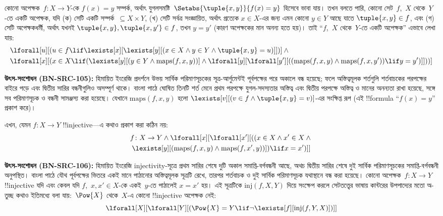 \documentclass[../../../include/open-logic-section]{subfiles}
\begin{document}
কোনো অপেক্ষক~$f \colon X \to Y$-কে $f(x)=y$ সম্পর্ক, অর্থাৎ
যুগলসমষ্টি~$\Setabs{\tuple{x,y}}{f(x)=y}$ হিসেবে ভাবা যায়। তখন বলতে
পারি, কোনো সেট~$f$,~$X$ থেকে~$Y$-তে একটি অপেক্ষক, যদি (ক) সেটি একটি
সম্পর্ক~$\subseteq X \times Y$, (খ) সেটি সর্বত্র সংজ্ঞায়িত, অর্থাৎ
প্রত্যেক $x \in X$-এর জন্য এমন কোনো $y \in Y$ আছে যাতে
$\tuple{x,y} \in f$, এবং (গ) সেটি অপেক্ষকধর্মী, অর্থাৎ যখনই
$\tuple{x,y},\tuple{x,y'} \in f$, তখন $y=y'$ (কারণ অপেক্ষকের মান
অনন্য হতে হয়)। তাই “$f$,~$X$ থেকে~$Y$-তে একটি অপেক্ষক” এভাবে লেখা
যায়:
\begin{align*}
 & \lforall[u][(u \in f \lif
      \lexists[x][\lexists[y][(x \in X \land y \in
      Y \land \tuple{x, y} = u)]])] \land {}\\
 & \lforall[x][(x \in X \lif
      (\lexists[y][(y \in Y \land \mathrm{maps}(f, x, y))] \land
      \lforall[y][\lforall[y'][((\mathrm{maps}(f, x, y) \land
      \mathrm{maps}(f, x, y')) \lif y = y')]]))]
\end{align*}
\par\smallskip\noindent\textnormal{\small\textbf{উৎস-সংশোধন (BN-SRC-105):} হিমায়িত ইংরেজি প্রদর্শনে উভয় সার্বিক পরিমাণসূচকের সূত্র-আর্গুমেন্টই পূর্বপক্ষের পরে অকালে বন্ধ হয়েছে; ফলে অস্তিত্বমূলক শর্তগুলি শর্তবাচকের পরপক্ষের বাইরে পড়ে এবং দ্বিতীয় সারির বন্ধনীগুলিও অসম্পূর্ণ থাকে। বাংলা পাঠে ঘোষিত তিনটি শর্ত মেনে প্রথম পরপক্ষে যুগল-সদস্যতার অস্তিত্ব এবং দ্বিতীয় পরপক্ষে অস্তিত্ব ও মানের অনন্যতা রাখা হয়েছে, সঙ্গে সব পরিমাণসূচক ও বন্ধনী সামঞ্জস্য করা হয়েছে।} %
যেখানে $\mathrm{maps}(f,x,y)$ হলো
$\lexists[v][(v \in f \land \tuple{x,y}=v)]$-এর সংক্ষিপ্ত রূপ
(এই !!{formula} “$f(x)=y$” প্রকাশ করে)।

এখন, যেমন $f\colon X\to Y$ !!{injective}—এ কথাও প্রকাশ করা কঠিন নয়:
\begin{multline*}
 f \colon X \to Y \land \lforall[x][\lforall[x'][((x \in X \land x' \in
     X \land {} \\
 \lexists[y][(\mathrm{maps}(f, x, y) \land \mathrm{maps}(f,
        x', y))]) \lif x = x')]]
\end{multline*}
\par\smallskip\noindent\textnormal{\small\textbf{উৎস-সংশোধন (BN-SRC-106):} হিমায়িত ইংরেজি injectivity-সূত্রে প্রথম সারির শেষে দুটি অকাল সমাপ্তি-বর্গবন্ধনী আছে, অথচ দ্বিতীয় সারির শেষে দুই সার্বিক পরিমাণসূচকের সমাপ্তি-বর্গবন্ধনী অনুপস্থিত। বাংলা পাঠে যৌথ পূর্বপক্ষের ভিতরে একই মানে পাঠানোর অস্তিত্বমূলক সূত্রটি রেখে, তারপর শর্তবাচক ও দুই সার্বিক পরিমাণসূচক যথাস্থানে বন্ধ করা হয়েছে।} %
কোনো অপেক্ষক~$f\colon X\to Y$ !!{injective} যদি এবং কেবল যদি
$f$,~$x,x'\in X$-কে একই~$y$-তে পাঠালেই $x=x'$ হয়। এই সূত্রটিকে
$\mathrm{inj}(f,X,Y)$ দিয়ে সংক্ষেপ করলে সেটতত্ত্বের ভাষায় কান্টরের
উপপাদ্যের মতো অ-তুচ্ছ কথাও ইতিমধ্যে বলা যায়:~$\Pow{X}$ থেকে~$X$-এ
কোনো !!{injective} অপেক্ষক নেই:
\[
\lforall[X][\lforall[Y][(\Pow{X} = Y \lif
    \lnot\lexists[f][\mathrm{inj}(f, Y, X)])]]
\]
\end{document}
